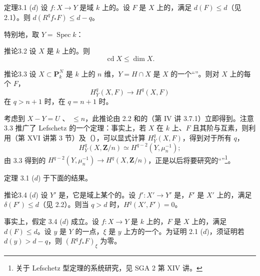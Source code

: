 \begin{SGAresult}{定理}{3.1 ($d$)}
设 $f:X\to Y$ 是域 $k$ 上的。设 $F$ 是 $X$ 上的，满足 $d(F)\leq d$（见 2.1）。则 $d(R^qf_*F)\leq d-q$。
\end{SGAresult}
特别地，取 $Y=\operatorname{Spec}k$：
\begin{SGAresult}{推论}{3.2}
设 $X$ 是 $k$ 上的。则
\[
\operatorname{cd}X\leq\dim X.
\]
\end{SGAresult}
\begin{SGAresult}{推论}{3.3}
设 $X\subset\mathbf P_k^N$ 是 $k$ 上的 $n$ 维，$Y=H\cap X$ 是 $X$ 的一个“”。则对 $X$ 上的每个 $F$，
\[
H_Y^q(X,F)\longrightarrow H^q(X,F)
\]
在 $q>n+1$ 时，在 $q=n+1$ 时。
\end{SGAresult}
考虑到 $X-Y=U$ 、 $\leq n$，此推论由 2.2 和的（第 IV 讲 3.7.1）立即得到。注意 3.3 推广了 Lefschetz 的一个定理：事实上，若 $X$ 在 $k$ 上、$F$ 且其阶与互素，则利用（第 XVI 讲第 3 节）及（），可以显式计算 $H_Y^q(X,F)$，得到对于所有 $q$，
\[
H_Y^q(X,\mathbf Z/n)\simeq H^{q-2}(Y,\mu_n^{-1});
\]
由 3.3 得到的 $H^{q-2}(Y,\mu_n^{-1})\to H^q(X,\mathbf Z/n)$，正是以后将要研究的“”\footnote{关于 Lefschetz 型定理的系统研究，见 SGA 2 第 XIV 讲。}。

定理 3.1 ($d$) 于下面的结果。
\begin{SGAresult}{推论}{3.4 ($d$)}
设 $Y'$ 是，它是域上某个的。设 $f':X'\to Y'$ 是，$F'$ 是 $X'$ 上的，满足 $\delta(F')\leq d$（见 2.2）。则当 $q>d$ 时，$H^q(X',F')=0$。
\end{SGAresult}
事实上，假定 3.4 ($d$) 成立。设 $f:X\to Y$ 是 $k$ 上的，$F$ 是 $X$ 上的，满足 $d(F)\leq d$。设 $y$ 是 $Y$ 的一点，$\xi$ 是 $y$ 上方的一个。为证明 2.1 ($d$)，须证明若 $d(y)>d-q$，则 $(R^qf_*F)_\xi$ 为零。

